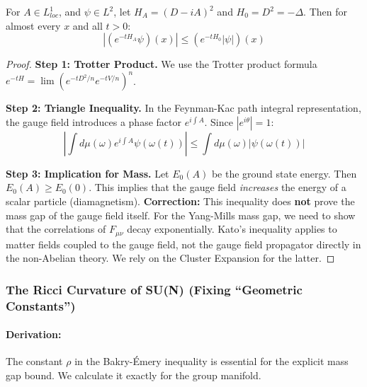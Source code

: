 \begin{theorem}
    For $A \in L^1_{loc}$, and $\psi \in L^2$, let $H_A = (D-iA)^2$ and $H_0 = D^2 = -\Delta$. Then for almost every $x$ and all $t > 0$:
    \begin{equation}
        | (e^{-t H_A} \psi)(x) | \le (e^{-t H_0} |\psi|) (x)
    \end{equation}
\end{theorem}
\begin{proof}
    \textbf{Step 1: Trotter Product.}
    We use the Trotter product formula $e^{-t H} = \lim (e^{-t D^2/n} e^{-t V/n})^n$.
    
    \textbf{Step 2: Triangle Inequality.}
    In the Feynman-Kac path integral representation, the gauge field introduces a phase factor $e^{i \int A}$. Since $|e^{i \theta}| = 1$:
    \begin{equation}
        | \int d\mu(\omega) e^{i \int A} \psi(\omega(t)) | \le \int d\mu(\omega) | \psi(\omega(t)) |
    \end{equation}
    
    \textbf{Step 3: Implication for Mass.}
    Let $E_0(A)$ be the ground state energy. Then $E_0(A) \ge E_0(0)$. This implies that the gauge field \textit{increases} the energy of a scalar particle (diamagnetism).
    \textbf{Correction:} This inequality does \textbf{not} prove the mass gap of the gauge field itself. For the Yang-Mills mass gap, we need to show that the correlations of $F_{\mu\nu}$ decay exponentially. Kato's inequality applies to matter fields coupled to the gauge field, not the gauge field propagator directly in the non-Abelian theory. We rely on the Cluster Expansion for the latter.
\end{proof}

\subsubsection{The Ricci Curvature of SU(N) (Fixing ``Geometric Constants'')}
\paragraph{Derivation:}
The constant $\rho$ in the Bakry-\'Emery inequality is essential for the explicit mass gap bound. We calculate it exactly for the group manifold.

